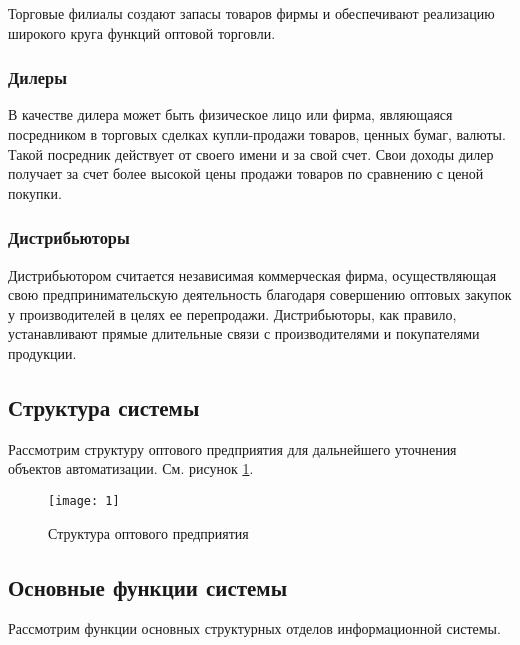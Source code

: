 \documentclass[a4paper,14pt]{extarticle}
\begin{document}
Торговые филиалы создают запасы товаров фирмы и обеспечивают реализацию широкого круга функций оптовой торговли.

\subsubsection{Дилеры}
В качестве дилера может быть физическое лицо или фирма, являющаяся посредником в торговых сделках купли-продажи товаров, ценных бумаг, валюты. Такой посредник действует от своего имени и за свой счет. Свои доходы дилер получает за счет более высокой цены продажи товаров по сравнению с ценой покупки.

\subsubsection{Дистрибьюторы}
Дистрибьютором считается независимая коммерческая фирма, осуществляющая свою предпринимательскую деятельность благодаря совершению оптовых закупок у производителей в целях ее перепродажи. Дистрибьюторы, как правило, устанавливают прямые длительные связи с производителями и покупателями продукции.

\subsection{Структура системы}
Рассмотрим структуру оптового предприятия для дальнейшего уточнения объектов автоматизации. См. рисунок \ref{img:struct}.

\begin{figure}[h!]
	\centering
	\texttt{[image: 1]}
	\caption{Структура оптового предприятия}
	\label{img:struct}
\end{figure}
\newpage
\subsection{Основные функции системы}
Рассмотрим функции основных структурных отделов информационной системы.
\small
\end{document}
